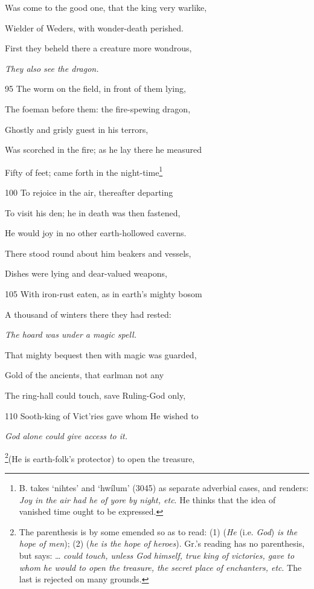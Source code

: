 Was come to the good one, that the king very warlike,

Wielder of Weders, with wonder-death perished.

First they beheld there a creature more wondrous,

\emph{They also see the
dragon.}

95
The worm on the field, in front of them lying,

The foeman before them: the fire-spewing dragon,

Ghostly and grisly guest in his terrors,

Was scorched in the fire; as he lay there he measured

Fifty of feet; came forth in the night-time\footnote{B. takes ‘nihtes’ and ‘hwílum’ (3045) as separate adverbial cases, and
renders: \emph{Joy in the air had he of yore by night, etc}. He thinks that the idea of
vanished time ought to be expressed.}

100
To rejoice in the air, thereafter departing

To visit his den; he in death was then fastened,

He would joy in no other earth-hollowed caverns.

There stood round about him beakers and vessels,

Dishes were lying and dear-valued weapons,

105
With iron-rust eaten, as in earth’s mighty bosom

A thousand of winters there they had rested:

\emph{The hoard was
under a magic
spell.}

That mighty bequest then with magic was guarded,

Gold of the ancients, that earlman not any

The ring-hall could touch, save Ruling-God only,

110
Sooth-king of Vict’ries gave whom He wished to

\emph{God alone could
give access to it.}

\footnote{The parenthesis is by some emended so as to read: (1) (\emph{He} (i.e. \emph{God})
\emph{is the hope of men}); (2) (\emph{he is the hope of heroes}). Gr.’s reading has no
parenthesis, but says: … \emph{could touch, unless God himself, true king of victories,
gave to whom he would to open the treasure, the secret place of enchanters,
etc}. The last is rejected on many grounds.}(He is earth-folk’s protector) to open the treasure,

